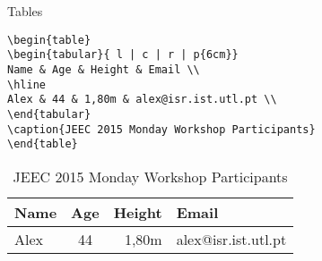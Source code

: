 \begin{frame}[fragile]{Tables}
\begin{lstlisting}
\begin{table}
\begin{tabular}{ l | c | r | p{6cm}}
Name & Age & Height & Email \\
\hline
Alex & 44 & 1,80m & alex@isr.ist.utl.pt \\
\end{tabular}
\caption{JEEC 2015 Monday Workshop Participants}
\end{table}
\end{lstlisting}
\begin{table}
\begin{tabular}{ l | c | r | p{6cm}}
Name & Age & Height & Email \\
\hline
Alex & 44 & 1,80m & alex@isr.ist.utl.pt \\
\end{tabular}
\caption{JEEC 2015 Monday Workshop Participants}
\end{table}
\end{frame}

